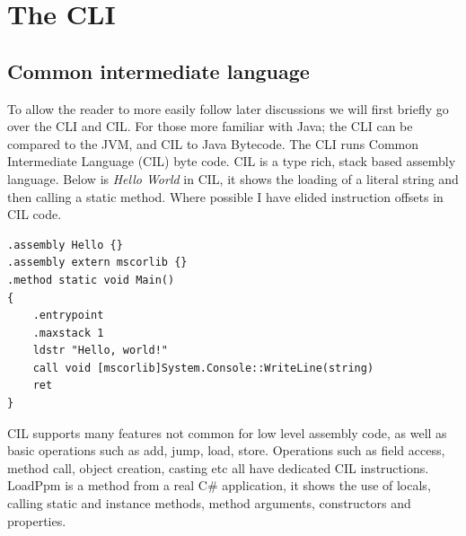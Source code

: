 \documentclass[english]{report}
\begin{document}
\section{The CLI}



\subsection{Common intermediate language}

To allow the reader to more easily follow later discussions we will
first briefly go over the CLI and CIL. For those more familiar with
Java; the CLI can be compared to the JVM, and CIL to Java Bytecode.
The CLI runs Common Intermediate Language (CIL) byte code. CIL is
a type rich, stack based assembly language. Below is \emph{Hello World}
in CIL, it shows the loading of a literal string and then calling
a static method. Where possible I have elided instruction offsets
in CIL code.

\begin{lstlisting}[caption={Hello world}]
.assembly Hello {} 
.assembly extern mscorlib {} 
.method static void Main() 
{     
	.entrypoint     
	.maxstack 1     
	ldstr "Hello, world!"     
	call void [mscorlib]System.Console::WriteLine(string)     
	ret 
}
\end{lstlisting}


CIL supports many features not common for low level assembly code,
as well as basic operations such as add, jump, load, store. Operations
such as field access, method call, object creation, casting etc all
have dedicated CIL instructions. LoadPpm is a method from a real C\#
application, it shows the use of locals, calling static and instance
methods, method arguments, constructors and properties. 
\end{document}
